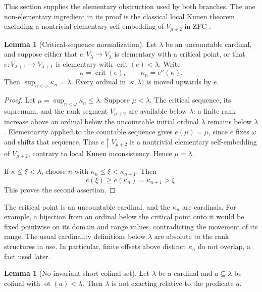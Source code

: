 \documentclass[11pt,letterpaper]{article}
\theoremstyle{definition}
\newtheorem{lemma}[definition]{Lemma}
\newcommand{\crit}{\operatorname{crit}}
\newcommand{\ot}{\operatorname{ot}}
\newcommand{\restr}{\mathbin{\upharpoonright}}
\begin{document}
This section supplies the elementary obstruction used by both branches. The one non-elementary ingredient in its proof is the classical local Kunen theorem excluding a nontrivial elementary self-embedding of $V_{\mu+2}$ in ZFC \cite{kunen,hkp}.

\begin{lemma}[Critical-sequence normalization]\label{lem:normalization}
Let $\lambda$ be an uncountable cardinal, and suppose either that $e:V_\lambda\to V_\lambda$ is elementary with a critical point, or that $e:V_{\lambda+1}\to V_{\lambda+1}$ is elementary with $\crit(e)<\lambda$. Write
\[
 \kappa=\crit(e),\qquad \kappa_n=e^n(\kappa).
\]
Then $\sup_{n<\omega}\kappa_n=\lambda$. Every ordinal in $[\kappa,\lambda)$ is moved upwards by $e$.
\end{lemma}

\begin{proof}
Let $\mu=\sup_{n<\omega}\kappa_n\leq\lambda$. Suppose $\mu<\lambda$. The critical sequence, its supremum, and the rank segment $V_{\mu+2}$ are available below $\lambda$: a finite rank increase above an ordinal below the uncountable initial ordinal $\lambda$ remains below $\lambda$. Elementarity applied to the countable sequence gives $e(\mu)=\mu$, since $e$ fixes $\omega$ and shifts that sequence. Thus $e\restr V_{\mu+2}$ is a nontrivial elementary self-embedding of $V_{\mu+2}$, contrary to local Kunen inconsistency. Hence $\mu=\lambda$.

If $\kappa\leq\xi<\lambda$, choose $n$ with $\kappa_n\leq\xi<\kappa_{n+1}$. Then
\[
 e(\xi)\geq e(\kappa_n)=\kappa_{n+1}>\xi.
\]
This proves the second assertion.
\end{proof}

The critical point is an uncountable cardinal, and the $\kappa_n$ are cardinals. For example, a bijection from an ordinal below the critical point onto it would be fixed pointwise on its domain and range values, contradicting the movement of its range. The usual cardinality definitions below $\lambda$ are absolute to the rank structures in use. In particular, finite offsets above distinct $\kappa_n$ do not overlap, a fact used later.

\begin{lemma}[No invariant short cofinal set]\label{lem:cofinal-predicate}
Let $\lambda$ be a cardinal and $a\subseteq\lambda$ be cofinal with $\ot(a)<\lambda$. Then $\lambda$ is not exacting relative to the predicate $a$.
\end{lemma}
\end{document}
